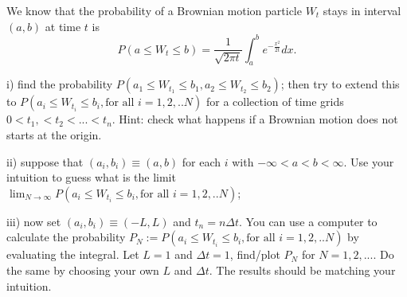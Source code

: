     \problem
    \begin{question}
        We know that the probability of a Brownian motion particle $W_t$
        stays in interval $(a,b)$ at time $t$ is
        \[P(a\leq W_t\leq b)=\frac{1}{\sqrt{2\pi t}}\int_a^be^{-\frac{x^2}{2t}}dx.\]

            \noindent i)
            find the probability $P(a_1\leq W_{t_1}\leq b_1,a_2\leq W_{t_2}\leq b_2)$;
            then try to extend this to  $P(a_i\leq W_{t_i}\leq b_i,\text{for all~} i=1,2,..N)$
            for a collection of time grids $0<t_1,<t_2<...<t_n$. Hint: check what happens 
            if a Brownian motion does not starts at the origin.

            \noindent ii)
            suppose that $(a_i,b_i)\equiv (a,b)$ for each $i$ with $-\infty<a<b<\infty$.
            Use your intuition to guess what is the limit $\lim_{N\rightarrow \infty}
            P(a_i\leq W_{t_i}\leq b_i,\text{for all~} i=1,2,..N)$;

            \noindent iii)
            now set $(a_i,b_i)\equiv (-L,L)$ and $t_n=n\Delta t$.  You can use
            a computer to calculate the probability $P_N:=P(a_i\leq W_{t_i}\leq b_i,
            \text{for all~} i=1,2,..N)$ by evaluating the integral.  Let $L=1$ and 
            $\Delta t=1$, find/plot $P_N$ for $N=1,2,...$.  Do the same by choosing 
            your own $L$ and $\Delta t$.  The results should be matching your intuition.
    \end{question}

